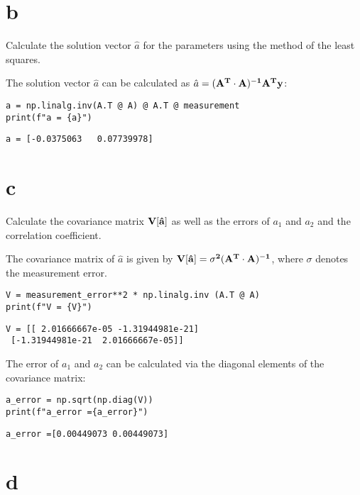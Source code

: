 \documentclass[11pt]{article}
\begin{document}
\section{b}
\label{sec:org9f258e7}

Calculate the solution vector \(\hat{a}\) for the parameters using the method of the least squares.

The solution vector \(\hat{a}\) can be calculated as \(\hat{a} = (\bf{A}^{T} \cdot \bf{A})^{-1} \bf{A}^{T} y\):

\begin{verbatim}
a = np.linalg.inv(A.T @ A) @ A.T @ measurement
print(f"a = {a}")
\end{verbatim}

\begin{verbatim}
a = [-0.0375063   0.07739978]
\end{verbatim}
\section{c}
\label{sec:org929eb75}

Calculate the covariance matrix \(\bf{V}[\hat{a}]\) as well as the errors of \(a_1\) and \(a_2\) and the correlation coefficient.

The covariance matrix of \(\hat{a}\) is given by \(\bf{V}[\hat{a}] = \sigma^2 (\bf{A}^{T} \cdot \bf{A})^{-1}\), where \(\sigma\) denotes the measurement error.

\begin{verbatim}
V = measurement_error**2 * np.linalg.inv (A.T @ A)
print(f"V = {V}")
\end{verbatim}

\begin{verbatim}
V = [[ 2.01666667e-05 -1.31944981e-21]
 [-1.31944981e-21  2.01666667e-05]]
\end{verbatim}


The error of \(a_1\) and \(a_2\) can be calculated via the diagonal elements of the covariance matrix:

\begin{verbatim}
a_error = np.sqrt(np.diag(V))
print(f"a_error ={a_error}")
\end{verbatim}

\begin{verbatim}
a_error =[0.00449073 0.00449073]
\end{verbatim}
\section{d}
\label{sec:org68fb914}
\end{document}
